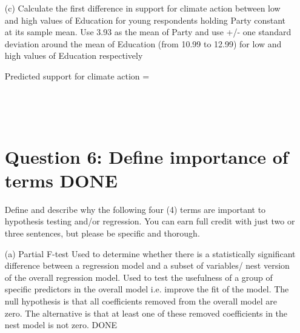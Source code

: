 \documentclass[12pt,letterpaper]{article}
\begin{document}
{\begin{enumerate}
	-17.491 \ge x 
	
	\begin{verbatim}
	Using R: 
	confint(fit, 'Age', level= 0.95)
\end{verbatim}

BASED ON YOUR ANSWER, DO YOU AGREE WITH THE AUTHOR?

DONE
\item [(c)] Calculate the first difference in support for climate action between low and high values
of Education for young respondents holding Party constant at its sample mean. Use
3.93 as the mean of Party and use +/- one standard deviation around the mean of
Education (from 10.99 to 12.99) for low and high values of Education respectively


Predicted support for climate action =  
\begin{verbatim}
	
	
	
\end{verbatim}
	\vspace{.5cm}
	\newpage
\section*{Question 6: Define importance of terms DONE}
Define and describe why the following four (4) terms are important to hypothesis testing
and/or regression. You can earn full credit with just two or three sentences, but please be
specific and thorough.
\item [(a)] Partial F-test
Used to determine whether there is a statistically significant difference between a regression model and a subset of variables/ nest version of the overall regression model. Used to test the usefulness of a group of specific predictors in the overall model i.e. improve the fit of the model.
The null hypothesis is that all coefficients removed from the overall model are zero. The alternative is that at least one of these removed coefficients in the nest model is not zero. DONE


\end{enumerate}}
\end{document}
